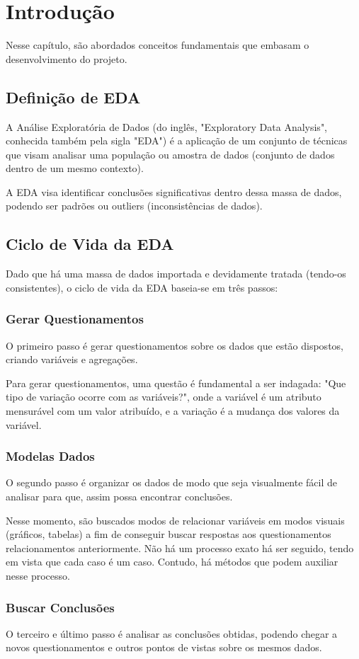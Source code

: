 \chapter{Introdução}	

Nesse capítulo, são abordados conceitos fundamentais que embasam o desenvolvimento do projeto.

\section{Definição de EDA}

A Análise Exploratória de Dados (do inglês, "Exploratory Data Analysis", conhecida também pela sigla "EDA") é a aplicação de um conjunto de técnicas que visam analisar uma população ou amostra de dados (conjunto de dados dentro de um mesmo contexto).

A EDA visa identificar conclusões significativas dentro dessa massa de dados, podendo ser padrões ou outliers (inconsistências de dados).

\section{Ciclo de Vida da EDA}

Dado que há uma massa de dados importada e devidamente tratada (tendo-os consistentes), o ciclo de vida da EDA baseia-se em três passos:

\subsection{Gerar Questionamentos}

O primeiro passo é gerar questionamentos sobre os dados que estão dispostos, criando variáveis e agregações.

Para gerar questionamentos, uma questão é fundamental a ser indagada: "Que tipo de variação ocorre com as variáveis?", onde a variável é um atributo mensurável com um valor atribuído, e a variação é a mudança dos valores da variável.

\subsection{Modelas Dados}

O segundo passo é organizar os dados de modo que seja visualmente fácil de analisar para que, assim possa encontrar conclusões.

Nesse momento, são buscados modos de relacionar variáveis em modos visuais (gráficos, tabelas) a fim de conseguir buscar respostas aos questionamentos relacionamentos anteriormente. Não há um processo exato há ser seguido, tendo em vista que cada caso é um caso. Contudo, há métodos que podem auxiliar nesse processo.

\subsection{Buscar Conclusões}

O terceiro e último passo é analisar as conclusões obtidas, podendo chegar a novos questionamentos e outros pontos de vistas sobre os mesmos dados.




